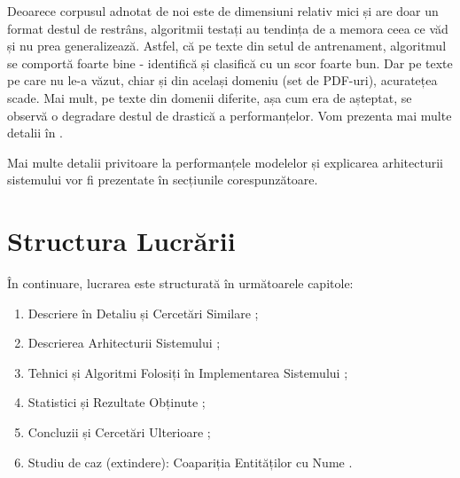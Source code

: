 Deoarece corpusul adnotat de noi este de dimensiuni relativ mici și are doar un format destul de restrâns, algoritmii testați au tendința de a memora ceea ce văd și nu prea generalizează. Astfel, că pe texte din setul de antrenament, algoritmul se comportă foarte bine - identifică și clasifică cu un scor foarte bun. Dar pe texte pe care nu le-a văzut, chiar și din același domeniu (set de PDF-uri), acuratețea scade. Mai mult, pe texte din domenii diferite, așa cum era de așteptat, se observă o degradare destul de drastică a performanțelor. Vom prezenta mai multe detalii în .

Mai multe detalii privitoare la performanțele modelelor și explicarea arhitecturii sistemului vor fi prezentate în secțiunile corespunzătoare.

\section{Structura Lucrării}

În continuare, lucrarea este structurată în următoarele capitole:

\begin{enumerate}

\item Descriere în Detaliu și Cercetări Similare ;
\item Descrierea Arhitecturii Sistemului ;
\item Tehnici și Algoritmi Folosiți în Implementarea Sistemului ;
\item Statistici și Rezultate Obținute ;
\item Concluzii și Cercetări Ulterioare ;
\item Studiu de caz (extindere): Coapariția Entităților cu Nume .

\end{enumerate}
